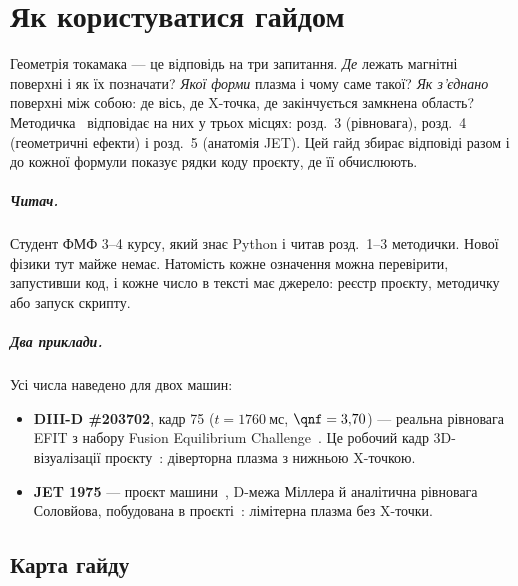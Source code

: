 \chapter{Як користуватися гайдом}\label{ch:geo1}

Геометрія токамака --- це відповідь на три запитання. \emph{Де} лежать магнітні поверхні і як їх позначати? \emph{Якої форми} плазма і чому саме такої? \emph{Як з'єднано} поверхні між собою: де вісь, де X-точка, де закінчується замкнена область? Методичка~\cite{Manual} відповідає на них у трьох місцях: розд.~3 (рівновага), розд.~4 (геометричні ефекти) і розд.~5 (анатомія JET). Цей гайд збирає відповіді разом і до кожної формули показує рядки коду проєкту, де її обчислюють.

\paragraph{Читач.} Студент ФМФ 3--4 курсу, який знає Python і читав розд.~1--3 методички. Нової фізики тут майже немає. Натомість кожне означення можна перевірити, запустивши код, і кожне число в тексті має джерело: реєстр проєкту, методичку або запуск скрипту.

\paragraph{Два приклади.} Усі числа наведено для двох машин:
\begin{itemize}
\item \textbf{DIII-D \#203702}, кадр 75 ($t=\SI{1760}{мс}$, $\qnf=3{,}70$) --- реальна рівновага EFIT з набору Fusion Equilibrium Challenge~\cite{FEC2026}. Це робочий кадр 3D-візуалізації проєкту~\cite{ProjViz}: діверторна плазма з нижньою X-точкою.
\item \textbf{JET 1975} --- проєкт машини~\cite{JET1975}, D-межа Міллера й аналітична рівновага Соловйова, побудована в проєкті~\cite{ProjJET}: лімітерна плазма без X-точки.
\end{itemize}

\section{Карта гайду}\label{sec:geo1-map}


